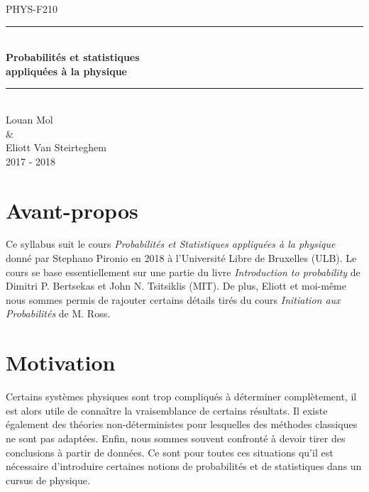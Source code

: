 \documentclass[a4paper,12pt]{report}
\theoremstyle{definition}
\newcommand{\HRule}{\rule{\linewidth}{0.5mm}}
\renewcommand{\(}{\left(}
\renewcommand{\)}{\right)}
\renewcommand{\d}{\textit}
\begin{document}
\begin{titlepage}
\begin{center}
    \large{PHYS-F210}
\end{center}


\begin{center}




\vspace{8.8cm}


\HRule \\[0.5cm]
{ \huge \bfseries Probabilités et statistiques \\ appliquées à la physique}\\[0.4cm]
\HRule \\[1.5cm]

\vspace{3cm}
Louan Mol \\ \& \\ Eliott Van Steirteghem \\

\vfill
\large 2017 - 2018

\vfill

\end{center}
\end{titlepage}
\newpage

\chapter*{Avant-propos}

    Ce syllabus suit le cours \d{Probabilités et Statistiques appliquées à la physique} donné par Stephano Pironio en 2018 à l'Université Libre de Bruxelles (ULB). Le cours se base essentiellement sur une partie du livre \d{Introduction to probability} de Dimitri P. Bertsekas et John N. Tsitsiklis (MIT). De plus, Eliott et moi-même nous sommes permis de rajouter certains détails tirés du cours \d{Initiation aux Probabilités} de M. Ross.
\pagebreak
\tableofcontents


\pagebreak
\chapter*{Motivation}

    Certains systèmes physiques sont trop compliqués à déterminer complètement, il est alors utile de connaître la vraisemblance de certains résultats. Il existe également des théories non-déterministes pour lesquelles des méthodes classiques ne sont pas adaptées. Enfin, nous sommes souvent confronté à devoir tirer des conclusions à partir de données. Ce sont pour toutes ces situations qu'il est nécessaire d'introduire certaines notions de probabilités et de statistiques dans un cursus de physique.\\
    
\end{document}
